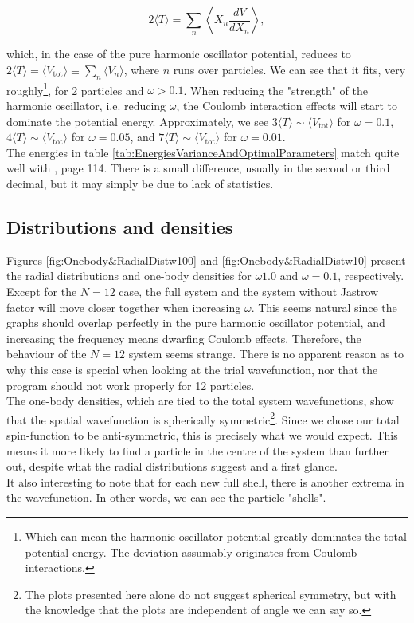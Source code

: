 \documentclass[english, a4paper]{article}
\begin{document}
	\begin{equation}
		2\langle T\rangle = \sum_n\left\langle X_n\frac{dV}{dX_n} \right\rangle,
	\end{equation}
	
	which, in the case of the pure harmonic oscillator potential, reduces to $2\langle T\rangle = \langle V_{\text{tot}}\rangle \equiv \sum_{n} \langle V_n\rangle$, where $n$ runs over particles. We can see that it fits, very roughly\footnote{Which can mean the harmonic oscillator potential greatly dominates the total potential energy. The deviation assumably originates from Coulomb interactions.}, for 2 particles and $\omega>0.1$. When reducing the "strength" of the harmonic oscillator, i.e. reducing $\omega$, the Coulomb interaction effects will start to dominate the potential energy. Approximately, we see $3\langle T\rangle \sim \langle V_{\text{tot}}\rangle$ for $\omega = 0.1$, $4\langle T\rangle \sim \langle V_{\text{tot}}\rangle$ for $\omega = 0.05$, and $7\langle T\rangle \sim \langle V_{\text{tot}}\rangle$ for $\omega = 0.01$.\\
	
	The energies in table \ref{tab:EnergiesVarianceAndOptimalParameters} match quite well with \cite{H_Msc}, page 114. There is a small difference, usually in the second or third decimal, but it may simply be due to lack of statistics.
	
	\subsection{Distributions and densities}
	Figures \ref{fig:Onebody&RadialDistw100} and \ref{fig:Onebody&RadialDistw10} present the radial distributions and one-body densities for $\omega1.0$ and $\omega = 0.1$, respectively. Except for the $N=12$ case, the full system and the system without Jastrow factor will move closer together when increasing $\omega$. This seems natural since the graphs should overlap perfectly in the pure harmonic oscillator potential, and increasing the frequency means dwarfing Coulomb effects. Therefore, the behaviour of the $N=12$ system seems strange. There is no apparent reason as to why this case is special when looking at the trial wavefunction, nor that the program should not work properly for 12 particles.\\
	
	The one-body densities, which are tied to the total system wavefunctions, show that the spatial wavefunction is spherically symmetric\footnote{The plots presented here alone do not suggest spherical symmetry, but with the knowledge that the plots are independent of angle we can say so.}. Since we chose our total spin-function to be anti-symmetric, this is precisely what we would expect. This means it more likely to find a particle in the centre of the system than further out, despite what the radial distributions suggest and a first glance.\\
	It also interesting to note that for each new full shell, there is another extrema in the wavefunction. In other words, we can see the particle "shells".\\
	
\end{document}
